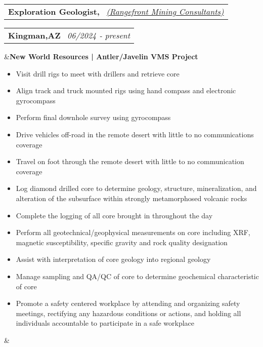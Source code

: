 \documentclass[11pt,a4paper,sans]{moderncv}
\makeatletter
\newcommand*{\customcventry}[7][.13em]{
\begin{tabular}{@{}l}
{\bfseries #4} \
{\itshape #3}
\end{tabular}
\hfill
\begin{tabular}{l@{}}
{\bfseries #5} \
{\itshape #2}
\end{tabular}
\ifx&#7&%
\else{\
\begin{minipage}{\maincolumnwidth}%
\small#7%
\end{minipage}}\fi%
\par\addvspace{#1}}
\makeatother
\begin{document}
\customcventry{06/2024 ‐ present}{{\color{blue}\href{https://www.rangefront.com/}{(Rangefront Mining Consultants)}}}{Exploration Geologist,}{Kingman,AZ}{}{\textbf{New World Resources | Antler/Javelin VMS Project}
\vspace{-1mm}
{\begin{itemize}[noitemsep, leftmargin=0.6cm, label={\textbullet}]
\item Visit drill rigs to meet with drillers and retrieve core
\item Align track and truck mounted rigs using hand compass and electronic gyrocompass
\item Perform final downhole survey using gyrocompass
\item Drive vehicles off-road in the remote desert with little to no communications coverage 
\item Travel on foot through the remote desert with little to no communication coverage 
\item Log diamond drilled core to determine geology, structure, mineralization, and alteration of the subsurface within strongly metamorphosed volcanic rocks
\item Complete the logging of all core brought in throughout the day 
\item Perform all geotechnical/geophysical measurements on core including XRF, magnetic susceptibility, specific gravity and rock quality designation
\item Assist with interpretation of core geology into regional geology 
\item Manage sampling and QA/QC of core to determine geochemical characteristic of core 
\item Promote a safety centered workplace by attending and organizing safety meetings, rectifying any hazardous conditions or actions, and holding all individuals accountable to participate in a safe workplace
\end{itemize}}}
\end{document}
